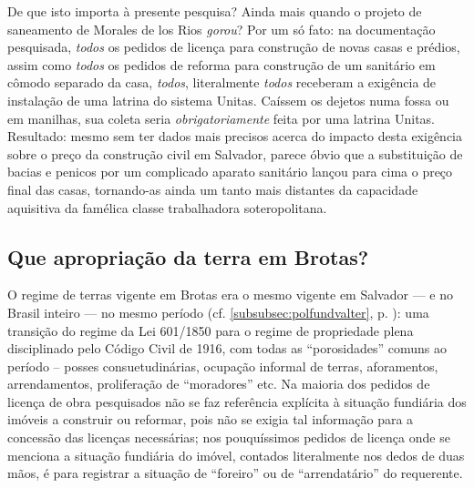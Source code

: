 De que isto importa à presente pesquisa? Ainda mais quando o projeto de saneamento de Morales de los Rios \textit{gorou}? Por um só fato: na documentação pesquisada, \textit{todos} os pedidos de licença para construção de novas casas e prédios, assim como \textit{todos} os pedidos de reforma para construção de um sanitário em cômodo separado da casa, \textit{todos}, literalmente \textit{todos} receberam a exigência de instalação de uma latrina do sistema Unitas. Caíssem os dejetos numa fossa ou em manilhas, sua coleta seria \textit{obrigatoriamente} feita por uma latrina Unitas. Resultado: mesmo sem ter dados mais precisos acerca do impacto desta exigência sobre o preço da construção civil em Salvador, parece óbvio que a substituição de bacias e penicos por um complicado aparato sanitário lançou para cima o preço final das casas, tornando-as ainda um tanto mais distantes da capacidade aquisitiva da famélica classe trabalhadora soteropolitana.

\subsection{Que apropriação da terra em Brotas?}\label{subsec:apropribrotas}

O regime de terras vigente em Brotas era o mesmo vigente em Salvador --- e no Brasil inteiro --- no mesmo período (cf. \autoref{subsubsec:polfundvalter}, p. \pageref{subsubsec:polfundvalter}): uma transição do regime da Lei 601/1850 para o regime de propriedade plena disciplinado pelo Código Civil de 1916, com todas as ``porosidades'' comuns ao período -- posses consuetudinárias, ocupação informal de terras, aforamentos, arrendamentos, proliferação de ``moradores'' etc. Na maioria dos pedidos de licença de obra pesquisados não se faz referência explícita à situação fundiária dos imóveis a construir ou reformar, pois não se exigia tal informação para a concessão das licenças necessárias; nos pouquíssimos pedidos de licença onde se menciona a situação fundiária do imóvel, contados literalmente nos dedos de duas mãos, é para registrar a situação de ``foreiro'' ou de ``arrendatário'' do requerente. 

